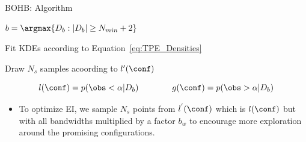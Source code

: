 \begin{frame}{BOHB: Algorithm}

\begin{centering}
\begin{minipage}{0.75\textwidth}
\begin{algorithm}[H]
    \LinesNumbered
    \SetAlgoLined
    \setcounter{AlgoLine}{0}
    \DeclarePairedDelimiter\ceil{\lceil}{\rceil}
    \DeclarePairedDelimiter\floor{\lfloor}{\rfloor}
    \DeclarePairedDelimiter\abs{\lvert}{\rvert}
    
    $b=\argmax \{D_b:\lvert D_b \rvert \geq N_{min}+2\}$
    
    
    Fit KDEs according to Equation~\ref{eq:TPE_Densities}
    
    Draw $N_s$ samples acoording to $l'(\conf)$
    
       
    
    \caption*{Pseudocode for sampling in BOHB}
\end{algorithm}
\end{minipage}
\end{centering}

\begin{equation}
    l(\conf)=p(\obs<\alpha| D_b)\quad\quad\quad\quad
    g(\conf)=p(\obs>\alpha| D_b)
    \label{eq:TPE_Densities}
\end{equation}

\begin{itemize}
    \item To optimize EI, we sample $N_s$ points from $l^{'}(\conf)$ which is $l(\conf)$ but with all bandwidths multiplied by a factor $b_w$ to encourage more exploration around the promising configurations.
\end{itemize}

\end{frame}
